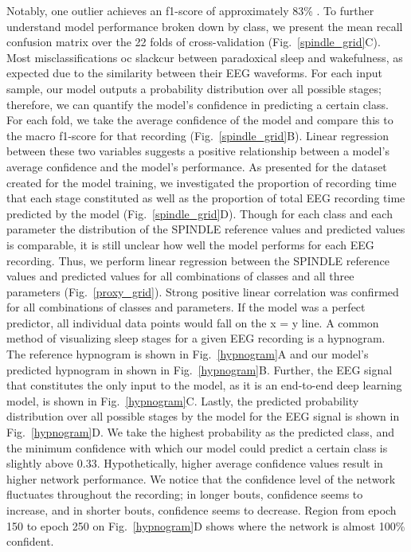 \documentclass[pdflatex,sn-mathphys-num]{sn-jnl}%
\theoremstyle{thmstyleone}%
\theoremstyle{thmstyletwo}%
\theoremstyle{thmstylethree}%
\begin{document}
Notably, one outlier achieves an f1-score of approximately 83\% . To further understand model performance broken down by class, we present the mean recall confusion matrix over the 22 folds of cross-validation  (Fig.~\ref{spindle_grid}C). Most misclassifications oc slackcur between paradoxical sleep and wakefulness, as expected due to the similarity between their EEG waveforms.
For each input sample, our model outputs a probability distribution over all possible stages; therefore, we can quantify the model's confidence in predicting a certain class. For each fold, we take the average confidence of the model and compare this to the macro f1-score  for that recording (Fig.~\ref{spindle_grid}B). Linear regression between these two variables suggests a positive relationship between a model's average confidence and the model's performance.
As presented for the dataset created for the model training, we investigated the proportion of recording time that each stage constituted as well as the proportion of total EEG recording time predicted by the model (Fig.~\ref{spindle_grid}D). Though for each class and each parameter the distribution of the SPINDLE reference values and predicted values is comparable, it is still unclear how well the model performs for each EEG recording. Thus, we perform linear regression between the SPINDLE reference values and predicted values for all combinations of classes and all three parameters (Fig.~\ref{proxy_grid}). Strong positive linear correlation was confirmed for all combinations of classes and parameters. If the model was a perfect predictor, all individual data points would fall on the x = y line.
A common method of visualizing sleep stages for a given EEG recording is a hypnogram. The reference hypnogram is shown in Fig.~\ref{hypnogram}A and our model's predicted hypnogram in shown in Fig.~\ref{hypnogram}B. Further, the EEG signal that constitutes the only input to the model, as it is an end-to-end deep learning model, is shown in Fig.~\ref{hypnogram}C.
Lastly, the predicted probability distribution over all possible stages by the model for the EEG signal is shown in Fig.~\ref{hypnogram}D. We take the highest probability as the predicted class, and the minimum confidence  with which our model could predict a certain class is slightly above 0.33. Hypothetically, higher average confidence values result in higher network performance. We notice that the confidence level of the network fluctuates throughout the recording; in longer bouts, confidence seems to increase, and in shorter bouts, confidence seems to decrease. Region from epoch 150 to epoch 250 on Fig.~\ref{hypnogram}D shows where the network is almost 100\% confident.
\end{document}
